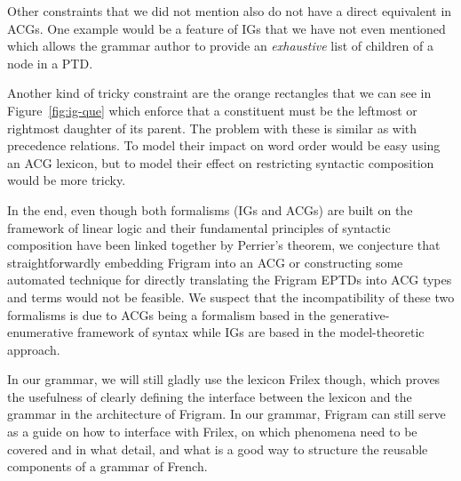 Other constraints that we did not mention also do not have a direct
equivalent in ACGs. One example would be a feature of IGs that we have
not even mentioned which allows the grammar author to provide an
\emph{exhaustive} list of children of a node in a PTD.

Another kind of tricky constraint are the orange rectangles that we can
see in Figure~\ref{fig:ig-que} which enforce that a constituent must be
the leftmost or rightmost daughter of its parent. The problem with these
is similar as with precedence relations. To model their impact on word
order would be easy using an ACG lexicon, but to model their effect on
restricting syntactic composition would be more tricky.

In the end, even though both formalisms (IGs and ACGs) are built on the
framework of linear logic and their fundamental principles of syntactic
composition have been linked together by Perrier's theorem, we
conjecture that straightforwardly embedding Frigram into an ACG or
constructing some automated technique for directly translating the
Frigram EPTDs into ACG types and terms would not be feasible. We suspect
that the incompatibility of these two formalisms is due to ACGs being a
formalism based in the generative-enumerative framework of syntax while
IGs are based in the model-theoretic approach.

In our grammar, we will still gladly use the lexicon Frilex though,
which proves the usefulness of clearly defining the interface between
the lexicon and the grammar in the architecture of Frigram. In our
grammar, Frigram can still serve as a guide on how to interface with
Frilex, on which phenomena need to be covered and in what detail, and
what is a good way to structure the reusable components of a grammar of
French.
